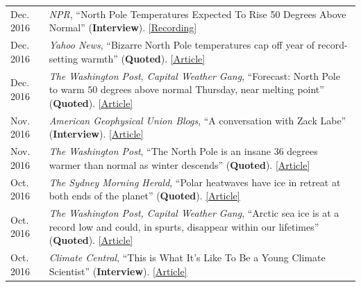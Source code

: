 \documentclass[margin,line,palatino,courier,10pt]{res}
\begin{document}
\begin{resume}
\begin{tabular}{@{}p{0.9in}p{4in}}
Dec. 2016 & \textit{NPR}, ``North Pole Temperatures Expected To Rise 50 Degrees Above Normal'' (\textbf{Interview}). \href{http://www.npr.org/2016/12/21/506483966/north-pole-temperatures-expected-to-rise-50-degrees-above-normal}{[Recording]}\\
Dec. 2016 & \textit{Yahoo News}, ``Bizarre North Pole temperatures cap off year of record-setting warmth'' (\textbf{Quoted}). \href{https://www.yahoo.com/news/bizarre-north-pole-temperatures-cap-off-year-of-record-setting-warmth-181727978.html?soc_src=social-sh&soc_trk=tw}{[Article]}\\
Dec. 2016 & \textit{The Washington Post, Capital Weather Gang}, ``Forecast: North Pole to warm $50$ degrees above normal Thursday, near melting point'' (\textbf{Quoted}). \href{https://www.washingtonpost.com/news/capital-weather-gang/wp/2016/12/20/forecast-north-pole-to-warm-50-degrees-above-normal-thursday-near-melting-point/?dfgdfgdfgdfg&utm_term=.e648369ada7e}{[Article]}\\
Nov. 2016 & \textit{American Geophysical Union Blogs}, ``A conversation with Zack Labe'' (\textbf{Interview}). \href{http://blogs.agu.org/mountainbeltway/2016/11/23/conversation-zack-labe/}{[Article]}\\
Nov. 2016 & \textit{The Washington Post}, ``The North Pole is an insane 36 degrees warmer than normal as winter descends'' (\textbf{Quoted}). \href{https://www.washingtonpost.com/news/energy-environment/wp/2016/11/17/the-north-pole-is-an-insane-36-degrees-warmer-than-normal-as-winter-descends/?utm_term=.f2cb9596b3d8}{[Article]}\\
Oct. 2016 & \textit{The Sydney Morning Herald}, ``Polar heatwaves have ice in retreat at both ends of the planet'' (\textbf{Quoted}). \href{http://www.smh.com.au/environment/climate-change/polar-heatwaves-have-ice-in-retreat-at-both-ends-of-the-planet-20161030-gse9q6.html}{[Article]}\\
Oct. 2016 & \textit{The Washington Post, Capital Weather Gang}, ``Arctic sea ice is at a record low and could, in spurts, disappear within our lifetimes'' (\textbf{Quoted}). \href{https://www.washingtonpost.com/news/capital-weather-gang/wp/2016/10/27/arctic-sea-ice-is-at-a-record-low-and-could-in-spurts-disappear-within-our-lifetimes/}{[Article]}\\
Oct. 2016 & \textit{Climate Central}, ``This is What It's Like To Be a Young Climate Scientist'' (\textbf{Interview}). \href{http://www.climatecentral.org/news/young-climate-scientists-interviews-20799}{[Article]}\\

\end{tabular}
\end{resume}
\end{document}
